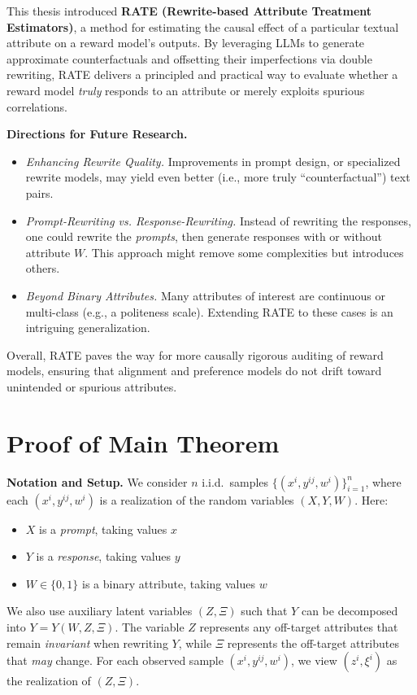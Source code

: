 \documentclass{article}
\theoremstyle{definition}
\begin{document}
This thesis introduced \textbf{RATE (Rewrite-based Attribute Treatment Estimators)}, a method for estimating the causal effect of a particular textual attribute on a reward model’s outputs. By leveraging LLMs to generate approximate counterfactuals and offsetting their imperfections via double rewriting, RATE delivers a principled and practical way to evaluate whether a reward model \emph{truly} responds to an attribute or merely exploits spurious correlations.

\textbf{Directions for Future Research.}
\begin{itemize}
    \item \emph{Enhancing Rewrite Quality.} Improvements in prompt design, or specialized rewrite models, may yield even better (i.e., more truly ``counterfactual'') text pairs.
    \item \emph{Prompt-Rewriting vs. Response-Rewriting.} Instead of rewriting the responses, one could rewrite the \emph{prompts}, then generate responses with or without attribute $W$. This approach might remove some complexities but introduces others.
    \item \emph{Beyond Binary Attributes.} Many attributes of interest are continuous or multi-class (e.g., a politeness scale). Extending RATE to these cases is an intriguing generalization.
\end{itemize}

Overall, RATE paves the way for more causally rigorous auditing of reward models, ensuring that alignment and preference models do not drift toward unintended or spurious attributes.

\newpage
\appendix
\section{Proof of Main Theorem}
\label{sec:proofs}
\noindent
\textbf{Notation and Setup.}  
We consider $n$ i.i.d.\ samples $\{(x^i, y^{ij}, w^i)\}_{i=1}^n$, where each $(x^i, y^{ij}, w^i)$ is a realization of the random variables $(X, Y, W)$. Here:
\begin{itemize}
    \item $X$ is a \emph{prompt}, taking values $x$
    \item $Y$ is a \emph{response}, taking values $y$
    \item $W \in \{0,1\}$ is a binary attribute, taking values $w$
\end{itemize}
We also use auxiliary latent variables $(Z, \Xi)$ such that $Y$ can be decomposed into $Y = Y(W, Z, \Xi)$. The variable $Z$ represents any off-target attributes that remain \emph{invariant} when rewriting $Y$, while $\Xi$ represents the off-target attributes that \emph{may} change. For each observed sample $(x^i, y^{ij}, w^i)$, we view $(z^i,\xi^i)$ as the realization of $(Z, \Xi)$.
\end{document}

